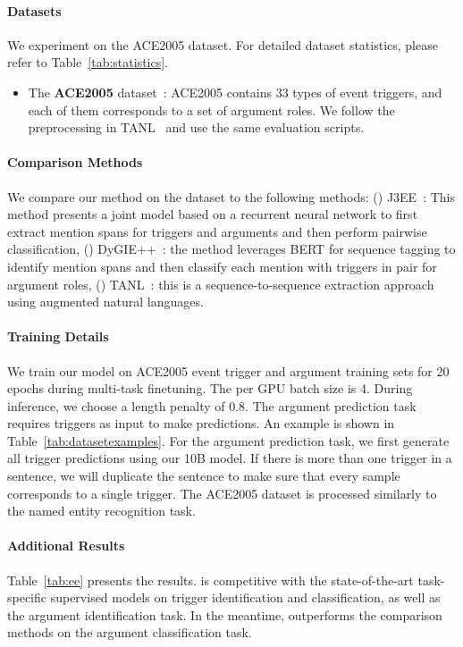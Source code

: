 \paragraph{Datasets}
We experiment on the ACE2005 dataset. For detailed dataset statistics, please refer to Table~\ref{tab:statistics}.
\begin{itemize}
    \item The {\bf ACE2005} dataset~\citep{walker2005ace}: ACE2005 contains 33 types of event triggers, and each of them corresponds to a set of argument roles. We follow the preprocessing in TANL~\cite{paolini2021structured} and use the same evaluation scripts. 
\end{itemize}

\paragraph{Comparison Methods}
We compare our method \method on the dataset to the following methods: (\expandafter{}) J3EE~\cite{nguyen2019one}: This method presents a joint model based on a recurrent neural network to first extract mention spans for triggers and arguments and then perform pairwise classification, (\expandafter{}) DyGIE++~\cite{wadden2019entity}: the method leverages BERT for sequence tagging to identify mention spans and then classify each mention with triggers in pair for argument roles, (\expandafter{}) TANL~\cite{paolini2021structured}: this is a sequence-to-sequence extraction approach using augmented natural languages.

\paragraph{Training Details} 
We train our model on ACE2005 event trigger and argument training sets for 20 epochs during multi-task finetuning. The per GPU batch size is 4. During inference, we choose a length penalty of 0.8. The argument prediction task requires triggers as input to make predictions. An example is shown in Table~\ref{tab:datasetexamples}. For the argument prediction task, we first generate all trigger predictions using our 10B model. If there is more than one trigger in a sentence, we will duplicate the sentence to make sure that every sample corresponds to a single trigger.
The ACE2005 dataset is processed similarly to the named entity recognition task.

\paragraph{Additional Results}
Table~\ref{tab:ee} presents the results. \method is competitive with the state-of-the-art task-specific supervised models on trigger identification and classification, as well as the argument identification task. In the meantime, \method outperforms the comparison methods on the argument classification task. 

